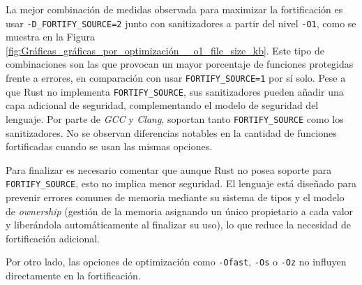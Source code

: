 La mejor combinación de medidas observada para maximizar la
fortificación es usar \texttt{-D\_FORTIFY\_SOURCE=2} junto con
sanitizadores a partir del nivel \texttt{-O1}, como se muestra en la Figura 
\ref{fig:Gráficas_gráficas_por_optimización__o1_file_size_kb}. 
Este tipo de combinaciones son las que provocan un mayor
porcentaje de funciones protegidas frente a errores, en comparación con
usar \texttt{FORTIFY\_SOURCE=1} por sí solo.
Pese a que Rust no implementa \texttt{FORTIFY\_SOURCE}, sus
sanitizadores pueden añadir una capa adicional de seguridad,
complementando el modelo de seguridad del lenguaje.
Por parte de \emph{GCC} y \emph{Clang}, soportan tanto
\texttt{FORTIFY\_SOURCE} como los sanitizadores. No se observan
diferencias notables en la cantidad de funciones fortificadas cuando se
usan las mismas opciones.

Para finalizar es necesario comentar que aunque Rust no posea soporte para
\texttt{FORTIFY\_SOURCE}, esto no implica menor seguridad.
El lenguaje está diseñado para prevenir errores comunes de memoria
mediante su sistema de tipos y el modelo de \emph{ownership} (gestión de la memoria asignando
un único propietario a cada valor y liberándola automáticamente al finalizar su uso), lo que
reduce la necesidad de fortificación adicional.

Por otro lado, las opciones de optimización como \texttt{-Ofast},
\texttt{-Os} o \texttt{-Oz} no influyen directamente en la
fortificación.

